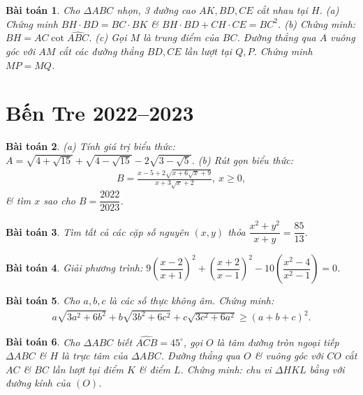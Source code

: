 \documentclass{article}
\newtheorem{baitoan}{Bài toán}
\begin{document}
\begin{baitoan}
	Cho $\Delta ABC$ nhọn, 3 đường cao $AK,BD,CE$ cắt nhau tại $H$. (a) Chứng minh $BH\cdot BD = BC\cdot BK$ \& $BH\cdot BD + CH\cdot CE = BC^2$. (b) Chứng minh: $BH = AC\cot\widehat{ABC}$. (c) Gọi $M$ là trung điểm của $BC$. Đường thẳng qua $A$ vuông góc với $AM$ cắt các đường thẳng $BD,CE$ lần lượt tại $Q,P$. Chứng minh $MP = MQ$.
\end{baitoan}


\section{Bến Tre 2022--2023}

\begin{baitoan}
	(a) Tính giá trị biểu thức: $A = \sqrt{4 + \sqrt{15}} + \sqrt{4 - \sqrt{15}} - 2\sqrt{3 - \sqrt{5}}$. (b) Rút gọn biểu thức:
	\begin{align*}
		B = \frac{x - 5 + 2\sqrt{x + 6\sqrt{x} + 9}}{x + 3\sqrt{x} + 2},\ x\ge0,
	\end{align*}
	\& tìm $x$ sao cho $B = \dfrac{2022}{2023}$.
\end{baitoan}

\begin{baitoan}
	Tìm tất cả các cặp số nguyên $(x,y)$ thỏa $\dfrac{x^2 + y^2}{x + y} = \dfrac{85}{13}$.
\end{baitoan}

\begin{baitoan}
	Giải phương trình: $9\left(\dfrac{x - 2}{x + 1}\right)^2 + \left(\dfrac{x + 2}{x - 1}\right)^2 - 10\left(\dfrac{x^2 - 4}{x^2  - 1}\right) = 0$.
\end{baitoan}

\begin{baitoan}
	Cho $a,b,c$ là các số thực không âm. Chứng minh:
	\begin{align*}
		a\sqrt{3a^2 + 6b^2} + b\sqrt{3b^2 + 6c^2} + c\sqrt{3c^2 + 6a^2}\ge(a + b + c)^2.
	\end{align*}
\end{baitoan}

\begin{baitoan}
	Cho $\Delta ABC$ biết $\widehat{ACB} = 45^\circ$, gọi $O$ là tâm đường tròn ngoại tiếp $\Delta ABC$ \& $H$ là trực tâm của $\Delta ABC$. Đường thẳng qua $O$ \& vuông góc với $CO$ cắt $AC$ \& $BC$ lần lượt tại điểm $K$ \& điểm $L$. Chứng minh: chu vi $\Delta HKL$ bằng với đường kính của $(O)$.
\end{baitoan}
\end{document}
